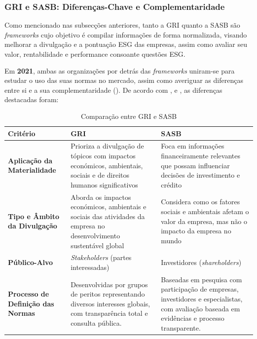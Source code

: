 
\subsubsection{GRI e SASB: Diferenças-Chave e Complementaridade}
\label{subsubsec: GRI_E_SASB}

Como mencionado nas subsecções anteriores, tanto a \gls{GRI} quanto a \gls{SASB} são \textit{frameworks} cujo objetivo é compilar informações de forma normalizada, visando melhorar a divulgação e a pontuação ESG das empresas, assim como avaliar seu valor, rentabilidade e performance consoante questões ESG.

Em \textbf{2021}, ambas as organizações por detrás das \textit{frameworks} uniram-se para estudar o uso das suas normas no mercado, assim como averiguar as diferenças entre si e a sua complementaridade (\cite{GRISASB2021}). De acordo com \cite{GRISASB2021}, \cite{Pizzi2023} e \cite{Antolin-Lopez2023}, as diferenças destacadas foram:

\begin{table}[h]
    \centering
    \begin{tabular}{|p{2.5cm}|p{5.5cm}|p{5.5cm}|}
        \hline
        \textbf{Critério} & \textbf{GRI} & \textbf{SASB} \\
        \hline
        \textbf{Aplicação da Materialidade} & Prioriza a divulgação de tópicos com impactos económicos, ambientais, sociais e de direitos humanos significativos & Foca em informações financeiramente relevantes que possam influenciar decisões de investimento e crédito \\
        \hline
        \textbf{Tipo e Âmbito da Divulgação} & Aborda os impactos económicos, ambientais e sociais das atividades da empresa no desenvolvimento sustentável global & Considera como os fatores sociais e ambientais afetam o valor da empresa, mas não o impacto da empresa no mundo \\
        \hline
        \textbf{Público-Alvo} & \textit{Stakeholders} (partes interessadas) & Investidores (\textit{shareholders}) \\
        \hline
        \textbf{Processo de Definição das Normas} & Desenvolvidas por grupos de peritos representando diversos interesses globais, com transparência total e consulta pública. & Baseadas em pesquisa com participação de empresas, investidores e especialistas, com avaliação baseada em evidências e processo transparente. \\
        \hline
    \end{tabular}
    \caption{Comparação entre GRI e SASB}
    \label{tab:gri_sasb}
\end{table}

